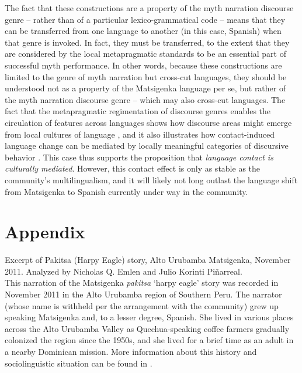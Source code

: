 \documentclass[output=paper]{LSP/langsci}
\begin{document}
The fact that these constructions are a property of the myth narration discourse genre – rather than of a particular lexico-grammatical code – means that they can be transferred from one language to another (in this case, Spanish) when that genre is invoked. In fact, they must be transferred, to the extent that they are considered by the local metapragmatic standards to be an essential part of successful myth performance. In other words, because these constructions are limited to the genre of myth narration but cross-cut languages, they should be understood not as a property of the Matsigenka language per se, but rather of the myth narration discourse genre – which may also cross-cut languages. The fact that the metapragmatic regimentation of discourse genres enables the circulation of features across languages shows how discourse areas might emerge from local cultures of language \citep[as in Amazonia;][]{beieretal.2002}, and it also illustrates how contact-induced language change can be mediated by locally meaningful categories of discursive behavior \citep[i.e., ‘culture’;][]{silverstein76}. This case thus supports the proposition that \textit{language contact is culturally mediated}. However, this contact effect is only as stable as the community’s multilingualism, and it will likely not long outlast the language shift from Matsigenka to Spanish currently under way in the community.
%



%
\section*{Appendix}
 \setcounter{equation}{0}
Excerpt of Pakitsa (Harpy Eagle) story, Alto Urubamba Matsigenka, November 2011. Analyzed by Nicholas Q. Emlen and Julio Korinti Piñarreal.\\

This narration of the Matsigenka \textit{pakitsa} `harpy eagle' story was recorded in November 2011 in the Alto Urubamba region of Southern Peru. The narrator (whose name is withheld per the arrangement with the community) grew up speaking Matsigenka and, to a lesser degree, Spanish. She lived in various places across the Alto Urubamba Valley as Quechua-speaking coffee farmers gradually colonized the region since the 1950s, and she lived for a brief time as an adult in a nearby Dominican mission. More information about this history and sociolinguistic situation can be found in \citet{emlen14,emlen.2015,emlen.2017,emlenforth}.
\end{document}
